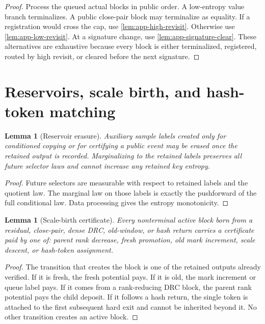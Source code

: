 \documentclass[11pt]{article}
\newcommand{\Cref}[1]{\ref{#1}}
\newtheorem{lemma}[theorem]{Lemma}
\theoremstyle{remark}
\begin{document}
\begin{proof}
Process the queued actual blocks in public order.  A low-entropy value branch terminalizes.  A public close-pair block may terminalize as equality.  If a registration would cross the cap, use \Cref{lem:app-high-revisit}.  Otherwise use \Cref{lem:app-low-revisit}.  At a signature change, use \Cref{lem:app-signature-clear}.  These alternatives are exhaustive because every block is either terminalized, registered, routed by high revisit, or cleared before the next signature.
\end{proof}

\section{Reservoirs, scale birth, and hash-token matching}\label{app:reservoir-scale}

\begin{lemma}[Reservoir erasure]\label{lem:app-reservoir}
Auxiliary sample labels created only for conditioned copying or for certifying a public event may be erased once the retained output is recorded.  Marginalizing to the retained labels preserves all future selector laws and cannot increase any retained key entropy.
\end{lemma}

\begin{proof}
Future selectors are measurable with respect to retained labels and the quotient law.  The marginal law on those labels is exactly the pushforward of the full conditional law.  Data processing gives the entropy monotonicity.
\end{proof}

\begin{lemma}[Scale-birth certificate]\label{lem:app-scale-birth}
Every nonterminal active block born from a residual, close-pair, dense DRC, old-window, or hash return carries a certificate paid by one of: parent rank decrease, fresh promotion, old mark increment, scale descent, or hash-token assignment.
\end{lemma}

\begin{proof}
The transition that creates the block is one of the retained outputs already verified.  If it is fresh, the fresh potential pays.  If it is old, the mark increment or queue label pays.  If it comes from a rank-reducing DRC block, the parent rank potential pays the child deposit.  If it follows a hash return, the single token is attached to the first subsequent hard exit and cannot be inherited beyond it.  No other transition creates an active block.
\end{proof}
\end{document}
